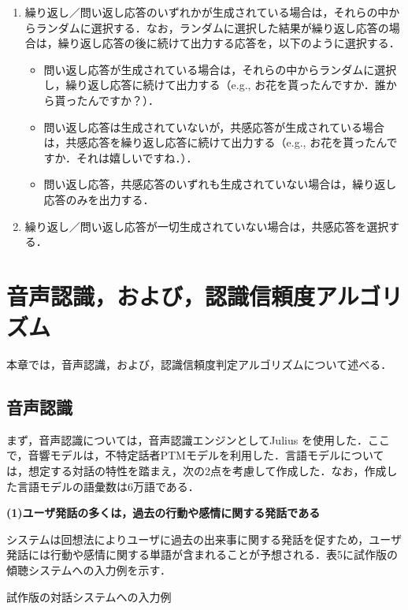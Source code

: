 \documentclass[japanese]{jnlp_1.4}
\begin{document}
\begin{enumerate}
  \item 繰り返し／問い返し応答のいずれかが生成されている場合は，それらの中からランダムに選択する．なお，ランダムに選択した結果が繰り返し応答の場合は，繰り返し応答の後に続けて出力する応答を，以下のように選択する．

\begin{itemize}
 \item 問い返し応答が生成されている場合は，それらの中からランダムに選択し，繰り返し応答に続けて出力する（e.g., お花を貰ったんですか．誰から貰ったんですか？）．
 \item 問い返し応答は生成されていないが，共感応答が生成されている場合は，共感応答を繰り返し応答に続けて出力する（e.g., お花を貰ったんですか．それは嬉しいですね．）．
 \item 問い返し応答，共感応答のいずれも生成されていない場合は，繰り返し応答のみを出力する．
\end{itemize}
  
\item 繰り返し／問い返し応答が一切生成されていない場合は，共感応答を選択する．
\end{enumerate}


\section{音声認識，および，認識信頼度アルゴリズム}

本章では，音声認識，および，認識信頼度判定アルゴリズムについて述べる．
 

\subsection{音声認識}

まず，音声認識については，音声認識エンジンとしてJulius \cite{no36}を使用した．ここで，音響モデルは，不特定話者PTMモデル\cite{no37}を利用した．言語モデルについては，想定する対話の特性を踏まえ，次の2点を考慮して作成した．なお，作成した言語モデルの語彙数は6万語である．


\noindent\textbf{(1)ユーザ発話の多くは，過去の行動や感情に関する発話である}

システムは回想法によりユーザに過去の出来事に関する発話を促すため，ユーザ発話には行動や感情に関する単語が含まれることが予想される．表5に試作版の傾聴システムへの入力例を示す．

\begin{table}[b]
\caption{試作版の対話システムへの入力例}
\label{table:5}

\end{table}
\end{document}
